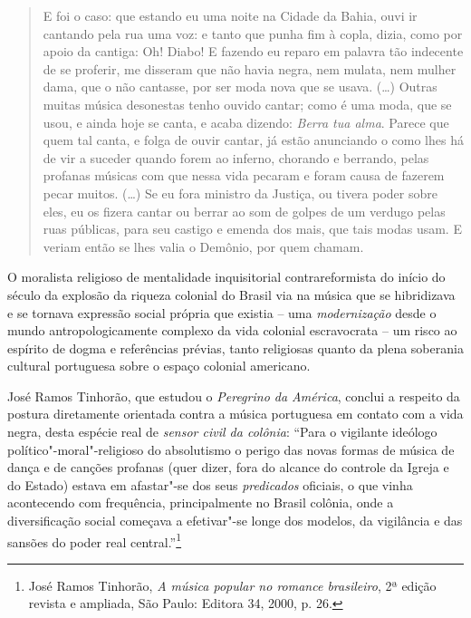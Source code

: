 \begin{quote}
E foi o caso: que estando eu uma noite na Cidade da Bahia, ouvi ir
cantando pela rua uma voz: e tanto que punha fim à copla, dizia, como
por apoio da cantiga: Oh! Diabo! E fazendo eu reparo em palavra tão
indecente de se proferir, me disseram que não havia negra, nem mulata,
nem mulher dama, que o não cantasse, por ser moda nova que se usava.
(\ldots{}) Outras muitas música desonestas tenho ouvido cantar; como é uma
moda, que se usou, e ainda hoje se canta, e acaba dizendo: \emph{Berra
tua alma}. Parece que quem tal canta, e folga de ouvir cantar, já estão
anunciando o como lhes há de vir a suceder quando forem ao inferno,
chorando e berrando, pelas profanas músicas com que nessa vida pecaram e
foram causa de fazerem pecar muitos. (\ldots{}) Se eu fora ministro da
Justiça, ou tivera poder sobre eles, eu os fizera cantar ou berrar ao
som de golpes de um verdugo pelas ruas públicas, para seu castigo e
emenda dos mais, que tais modas usam. E veriam então se lhes valia o
Demônio, por quem chamam.
\end{quote}

O moralista religioso de mentalidade inquisitorial contrareformista do
início do século da explosão da riqueza colonial do Brasil via na música
que se hibridizava e se tornava expressão social própria que existia --
uma \emph{modernização} desde o mundo antropologicamente complexo da
vida colonial escravocrata -- um risco ao espírito de dogma e
referências prévias, tanto religiosas quanto da plena soberania cultural
portuguesa sobre o espaço colonial americano.

José Ramos Tinhorão, que estudou o \emph{Peregrino da América}, conclui
a respeito da postura diretamente orientada contra a música portuguesa
em contato com a vida negra, desta espécie real de \emph{sensor civil da
colônia}: ``Para o vigilante ideólogo político"-moral"-religioso do
absolutismo o perigo das novas formas de música de dança e de canções
profanas (quer dizer, fora do alcance do controle da Igreja e do Estado)
estava em afastar"-se dos seus \emph{predicados} oficiais, o que vinha
acontecendo com frequência, principalmente no Brasil colônia, onde a
diversificação social começava a efetivar"-se longe dos modelos, da
vigilância e das sansões do poder real central.''\footnote{José Ramos
  Tinhorão, \emph{A música popular no romance brasileiro}, 2ª edição
  revista e ampliada, São Paulo: Editora 34, 2000, p. 26.}

